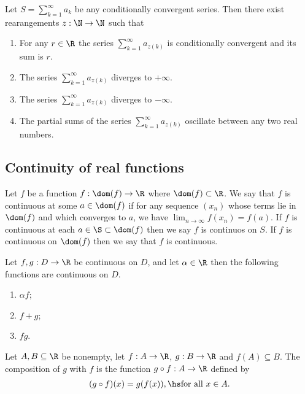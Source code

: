 \documentclass{article}
\begin{document}
\begin{theorem}[Notes 1.9]
	Let $S=\sum_{k=1}^\infty a_k$ be any conditionally convergent series. Then there
	exist rearangements $z:\N\to\N$ such that
	\begin{enumerate}
		\item For any $r\in\R$ the series $\sum_{k=1}^\infty a_{z(k)}$ is conditionally
		      convergent and its sum is $r$.
		\item The series $\sum_{k=1}^\infty a_{z(k)}$ diverges to $+\infty$.
		\item The series $\sum_{k=1}^\infty a_{z(k)}$ diverges to $-\infty$.
		\item The partial sums of the series $\sum_{k=1}^\infty a_{z(k)}$ oscillate between any two real numbers.
	\end{enumerate}
\end{theorem}

\subsection{Continuity of real functions}

\begin{definition}[Notes 1.7]
	Let $f$ be a function $f:\dom(f)\to\R$ where $\dom(f)\subset\R$. We say that $f$ is
	continuous at some $a\in\dom(f)$ if for any sequence $(x_n)$ whose terms lie in
	$\dom(f)$ and which converges to $a$, we have $\lim_{n\to\infty}f(x_n)=f(a)$. If
	$f$ is continuous at each $a\in\S\subset\dom(f)$ then we say $f$ is continuos on $S$.
	If $f$ is continuous on $\dom(f)$ then we say that $f$ is continuous.
\end{definition}

\begin{theorem}[Notes 1.10]
	Let $f,g:D\to\R$ be continuous on $D$, and let $\alpha\in\R$ then the following functions
	are continuous on $D$.
	\begin{enumerate}
		\item $\alpha f$;
		\item $f+g$;
		\item $fg$.
	\end{enumerate}
\end{theorem}

\begin{definition}[Notes 1.8]
	Let $A,B\subseteq\R$ be nonempty, let $f:A\to\R$, $g:B\to\R$ and $f(A)\subseteq B$. The
	composition of $g$ with $f$ is the function $g\circ f:A\to\R$ defined by
	\begin{align*}
		(g\circ f)(x) = g(f(x)),\hs \text{for all }x\in A.
	\end{align*}
\end{definition}
\end{document}
